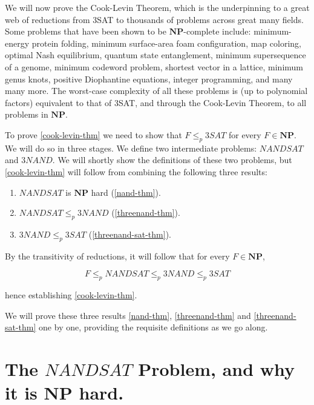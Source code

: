 We will now prove the Cook-Levin Theorem, which is the underpinning to a
great web of reductions from 3SAT to thousands of problems across great
many fields. Some problems that have been shown to be
\(\mathbf{NP}\)-complete include: minimum-energy protein folding,
minimum surface-area foam configuration, map coloring, optimal Nash
equilibrium, quantum state entanglement, minimum supersequence of a
genome, minimum codeword problem, shortest vector in a lattice, minimum
genus knots, positive Diophantine equations, integer programming, and
many many more. The worst-case complexity of all these problems is (up
to polynomial factors) equivalent to that of 3SAT, and through the
Cook-Levin Theorem, to all problems in \(\mathbf{NP}\).

To prove \cref{cook-levin-thm} we need to show that
\(F \leq_p 3\ensuremath{\mathit{SAT}}\) for every \(F\in \mathbf{NP}\).
We will do so in three stages. We define two intermediate problems:
\(\ensuremath{\mathit{NANDSAT}}\) and \(3\ensuremath{\mathit{NAND}}\).
We will shortly show the definitions of these two problems, but
\cref{cook-levin-thm} will follow from combining the following three
results:

\begin{enumerate}
\def\labelenumi{\arabic{enumi}.}
\item
  \(\ensuremath{\mathit{NANDSAT}}\) is \(\mathbf{NP}\) hard
  (\cref{nand-thm}).
\item
  \(\ensuremath{\mathit{NANDSAT}} \leq_p 3\ensuremath{\mathit{NAND}}\)
  (\cref{threenand-thm}).
\item
  \(3\ensuremath{\mathit{NAND}} \leq_p 3\ensuremath{\mathit{SAT}}\)
  (\cref{threenand-sat-thm}).
\end{enumerate}

By the transitivity of reductions, it will follow that for every
\(F \in \mathbf{NP}\),

\[
F \leq_p \ensuremath{\mathit{NANDSAT}} \leq_p 3\ensuremath{\mathit{NAND}} \leq_p 3\ensuremath{\mathit{SAT}}
\]

hence establishing \cref{cook-levin-thm}.

We will prove these three results \cref{nand-thm}, \cref{threenand-thm}
and \cref{threenand-sat-thm} one by one, providing the requisite
definitions as we go along.

\section{The \(\ensuremath{\mathit{NANDSAT}}\) Problem, and why it is
\(\mathbf{NP}\) hard.}\label{The-ensuremathmathitNANDS}

